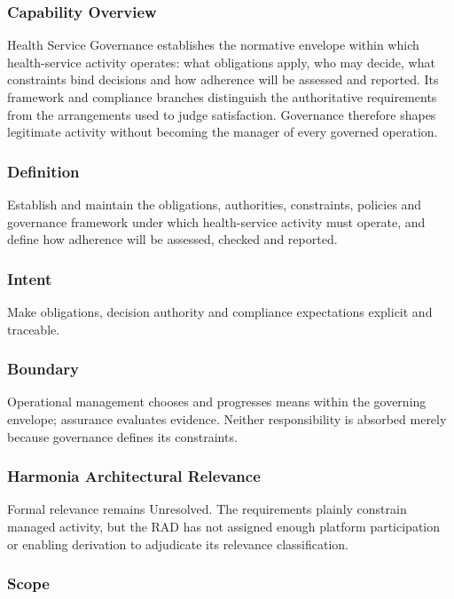 \subsubsection*{Capability Overview}

Health Service Governance establishes the normative envelope within which health-service activity operates: what obligations apply, who may decide, what constraints bind decisions and how adherence will be assessed and reported. Its framework and compliance branches distinguish the authoritative requirements from the arrangements used to judge satisfaction. Governance therefore shapes legitimate activity without becoming the manager of every governed operation.

\subsubsection*{Definition}

Establish and maintain the obligations, authorities, constraints, policies and governance framework under which health-service activity must operate, and define how adherence will be assessed, checked and reported.

\subsubsection*{Intent}

Make obligations, decision authority and compliance expectations explicit and traceable.

\subsubsection*{Boundary}

Operational management chooses and progresses means within the governing envelope; assurance evaluates evidence. Neither responsibility is absorbed merely because governance defines its constraints.

\subsubsection*{Harmonia Architectural Relevance}

Formal relevance remains Unresolved. The requirements plainly constrain managed activity, but the RAD has not assigned enough platform participation or enabling derivation to adjudicate its relevance classification.

\subsubsection*{Scope}
